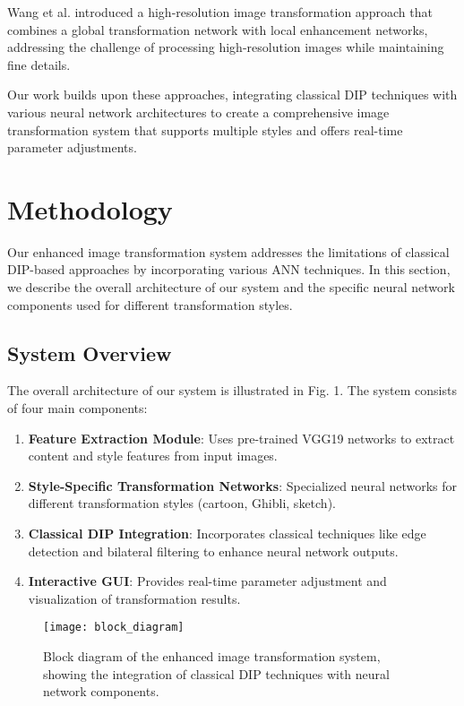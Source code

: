 \documentclass[conference]{IEEEtran}
\begin{document}
Wang et al. \cite{wang2018high} introduced a high-resolution image transformation approach that combines a global transformation network with local enhancement networks, addressing the challenge of processing high-resolution images while maintaining fine details.

Our work builds upon these approaches, integrating classical DIP techniques with various neural network architectures to create a comprehensive image transformation system that supports multiple styles and offers real-time parameter adjustments.

\section{Methodology}
Our enhanced image transformation system addresses the limitations of classical DIP-based approaches by incorporating various ANN techniques. In this section, we describe the overall architecture of our system and the specific neural network components used for different transformation styles.

\subsection{System Overview}
The overall architecture of our system is illustrated in Fig. 1. The system consists of four main components:

\begin{enumerate}
    \item \textbf{Feature Extraction Module}: Uses pre-trained VGG19 networks to extract content and style features from input images.
    \item \textbf{Style-Specific Transformation Networks}: Specialized neural networks for different transformation styles (cartoon, Ghibli, sketch).
    \item \textbf{Classical DIP Integration}: Incorporates classical techniques like edge detection and bilateral filtering to enhance neural network outputs.
    \item \textbf{Interactive GUI}: Provides real-time parameter adjustment and visualization of transformation results.
\end{enumerate}

\begin{figure}[!t]
\centering
\texttt{[image: block\_diagram]}
\caption{Block diagram of the enhanced image transformation system, showing the integration of classical DIP techniques with neural network components.}
\label{fig_block_diagram}
\end{figure}
\end{document}

